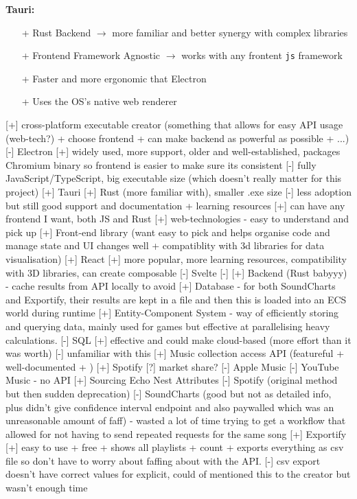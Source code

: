 \textbf{Tauri:}\begin{itemize}
    \item[+] Rust Backend \(\to\) more familiar and better synergy with complex libraries
    \item[+] Frontend Framework Agnostic \(\to\) works with any frontent \texttt{js} framework
    \item[+] Faster and more ergonomic that Electron
    \item[+] Uses the OS's native web renderer 
\end{itemize}
[+] cross-platform executable creator (something that allows for easy API usage (web-tech?) + choose frontend + can make backend as powerful as possible + ...)
    [-] Electron
        [+] widely used, more support, older and well-established, packages Chromium binary so frontend is easier to make sure its consistent
        [-] fully JavaScript/TypeScript, big executable size (which doesn't really matter for this project)
    [+] Tauri
        [+] Rust (more familiar with), smaller .exe size
        [-] less adoption but still good support and documentation + learning resources
        [+] can have any frontend I want, both JS and Rust
    [+] web-technologies - easy to understand and pick up
[+] Front-end library (want easy to pick and helps organise code and manage state and UI changes well + compatiblity with 3d libraries for data visualisation)
    [+] React
        [+] more popular, more learning resources, compatibility with 3D libraries, can create composable
    [-] Svelte
    [-] 
[+] Backend (Rust babyyy) - cache results from API locally to avoid
[+] Database - for both SoundCharts and Exportify, their results are kept in a file and then this is loaded into an ECS world during runtime
    [+] Entity-Component System - way of efficiently storing and querying data, mainly used for games but effective at parallelising heavy calculations.
    [-] SQL
        [+] effective and could make cloud-based (more effort than it was worth)
        [-] unfamiliar with this
[+] Music collection access API (featureful + well-documented + )
    [+] Spotify
        [?] market share?
    [-] Apple Music
    [-] YouTube Music - no API %
[+] Sourcing Echo Nest Attributes
    [-] Spotify (original method but then sudden deprecation)
    [-] SoundCharts (good but not as detailed info, plus didn't give confidence interval endpoint and also paywalled which was an unreasonable amount of faff) - wasted a lot of time trying to get a workflow that allowed for not having to send repeated requests for the same song
    [+] Exportify
        [+] easy to use + free + shows all playlists + count + exports everything as csv file so don't have to worry about faffing about with the API.
        [-] csv export doesn't have correct values for explicit, could of mentioned this to the creator but wasn't enough time

